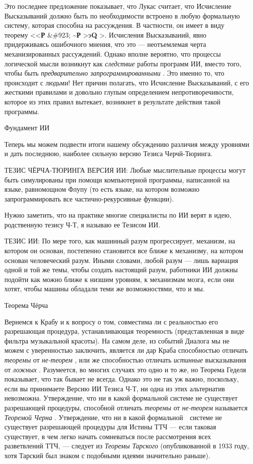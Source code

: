 \documentclass[../main.tex]{subfiles}
\begin{document}
Это последнее предложение показывает, что Лукас считает, что Исчисление Высказываний должно быть по необходимости встроено в любую формальную систему, которая способна на рассуждения. В частности, он имеет в виду теорему \textless\textless{}\textbf{Р} \&\#923; \textbf{\textasciitilde Р} \textgreater э\textbf{Q} \textgreater. Исчисления Высказываний, явно придерживаясь ошибочного мнения, что это --- неотъемлемая черта механизированных рассуждений. Однако вполне вероятно, что процессы логической мысли возникнут как \emph{следствие} работы программ ИИ, вместо того, чтобы быть \emph{предварительно запрограммированными} . Это именно то, что происходит с людьми! Нет причин полагать, что Исчисление Высказываний, с его жесткими правилами и довольно глупым определением непротиворечивости, которое из этих правил вытекает, возникнет в результате действия такой программы.

Фундамент ИИ

Теперь мы можем подвести итоги нашему обсуждению различия между уровнями и дать последнюю, наиболее сильную версию Тезиса Черчй-Тюринга.

ТЕЗИС ЧЁРЧА-ТЮРИНГА ВЕРСИЯ ИИ: Любые мыслительные процессы могут быть симулированы при помощи компьютерной программы, написанной на языке, равномощном Флупу (то есть языке, на котором возможно запрограммировать все частично-рекурсивные функции).

Нужно заметить, что на практике многие специалисты по ИИ верят в идею, родственную тезису Ч-Т, я называю ее Тезисом ИИ.

ТЕЗИС ИИ: По мере того, как машинный разум прогрессирует, механизм, на котором он основан, постепенно становится все ближе к механизму, на котором основан человеческий разум. Иными словами, любой разум --- лишь вариация одной и той же темы, чтобы создать настоящий разум, работники ИИ должны подойти как можно ближе к низшим уровням, к механизмам мозга, если они хотят, чтобы машины обладали теми же возможностями, что и мы.

Теорема Чёрча

Вернемся к Крабу и к вопросу о том, совместима ли с реальностью его разрешающая процедура, устанавливающая теоремность (представленная в виде фильтра музыкальной красоты). На самом деле, из событий Диалога мы не можем с уверенностью заключить, является ли дар Краба способностью отличать \emph{теоремы} от \emph{не-теорем} , или же способностью отличать \emph{истинные} высказывания от \emph{ложных} . Разумеется, во многих случаях это одно и то же, но Теорема Геделя показывает, что так бывает не всегда. Однако это не так уж важно, поскольку, если вы принимаете Версию ИИ Тезиса Ч-Т, ни одна из этих альтернатив невозможна. Утверждение, что ни в какой формальной системе не существует разрешающей процедуры, способной отличать \emph{теоремы} от \emph{не-теорем} называется \emph{Теоремой Черна} . Утверждение, что ни в какой формальной~~системе не существует разрешающей процедуры для Истины ТТЧ --- если таковая существует, в чем легко начать сомневаться после рассмотрения всех разветвлений ТТЧ, --- следует из \emph{Теоремы Тарского} (опубликованной в 1933 году, хотя Тарский был знаком с подобными идеями значительно раньше).
\end{document}
